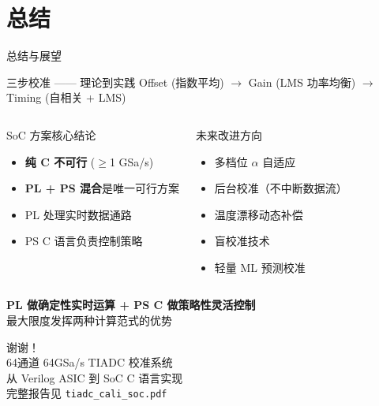 \documentclass[table,UTF8,11pt,aspectratio=169]{beamer}
\begin{document}
\section{总结}

\begin{frame}{总结与展望}
\begin{block}{三步校准 —— 理论到实践}
Offset (指数平均) $\to$ Gain (LMS 功率均衡) $\to$ Timing (自相关 + LMS)
\end{block}

\begin{columns}[T]
\begin{block}{SoC 方案核心结论}
\begin{itemize}
    \item \textbf{纯 C 不可行} ($\ge$1 GSa/s)
    \item \textbf{PL + PS 混合}是唯一可行方案
    \item PL 处理实时数据通路
    \item PS C 语言负责控制策略
\end{itemize}
\end{block}

\begin{block}{未来改进方向}
\begin{itemize}
    \item 多档位 $\alpha$ 自适应
    \item 后台校准（不中断数据流）
    \item 温度漂移动态补偿
    \item 盲校准技术
    \item 轻量 ML 预测校准
\end{itemize}
\end{block}
\end{columns}

\vspace{0.3cm}
\centering
\Large\textbf{PL 做确定性实时运算 + PS C 做策略性灵活控制}\\
\normalsize\vspace{0.2cm}
最大限度发挥两种计算范式的优势
\end{frame}

\begin{frame}{}
\centering
\Huge 谢谢！\\
\vspace{1cm}
\Large 64通道 64GSa/s TIADC 校准系统\\
\normalsize
\vspace{0.5cm}
从 Verilog ASIC 到 SoC C 语言实现\\
\vspace{0.5cm}
\footnotesize 完整报告见 \texttt{tiadc\_cali\_soc.pdf}
\end{frame}
\end{document}
